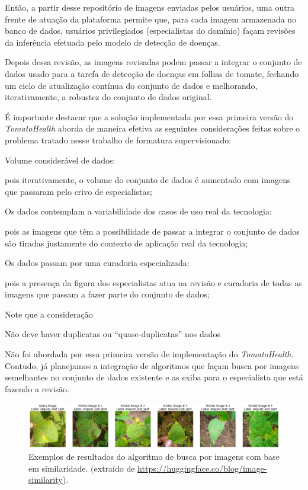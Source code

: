 Então, a partir desse repositório de imagens enviadas pelos usuários, uma outra frente de atuação da plataforma permite que, para cada imagem armazenada no banco de dados, usuários privilegiados (especialistas do domínio) façam revisões da inferência efetuada pelo modelo de detecção de doenças. 

Depois dessa revisão, as imagens revisadas podem passar a integrar o conjunto de dados usado para a tarefa de detecção de doenças em folhas de tomate, fechando um ciclo de atualização contínua do conjunto de dados e melhorando, iterativamente, a robustez do conjunto de dados original.

É importante destacar que a solução implementada por essa primeira versão do \emph{TomatoHealth} aborda de maneira efetiva as seguintes considerações feitas sobre o problema tratado nesse trabalho de formatura supervisionado:

\begin{enumerate}
{\bf \item  Volume considerável de dados:} pois iterativamente, o volume do conjunto de dados é aumentado com imagens que passaram pelo crivo de especialistas;

{\bf \item Os dados contemplam a variabilidade dos casos de uso real da tecnologia:} pois as imagens que têm a possibilidade de passar a integrar o conjunto de dados são tiradas justamente do contexto de aplicação real da tecnologia;

{\bf \item Os dados passam por uma curadoria especializada:} pois a presença da figura dos especialistas atua na revisão e curadoria de todas as imagens que passam a fazer parte do conjunto de dados;

\end{enumerate}

Note que a consideração 

\begin{enumerate}
    \setcounter{enumi}{3}
    {\bf \item Não deve haver duplicatas ou ``quase-duplicatas'' nos dados}
\end{enumerate}

Não foi abordada por essa primeira versão de implementação do \emph{TomatoHealth}. Contudo, já planejamos a integração de algoritmos que façam busca por imagens semelhantes no conjunto de dados existente e as exiba para o especialista que está fazendo a revisão.

\begin{figure}
    \centering
    \includegraphics[width=1\linewidth]{images/results_one.png}
    \caption{\label{fig:similaridade}Exemplos de resultados do algoritmo de busca por imagens com base em similaridade. (extraído de \url{https://huggingface.co/blog/image-similarity}).}
\end{figure}

